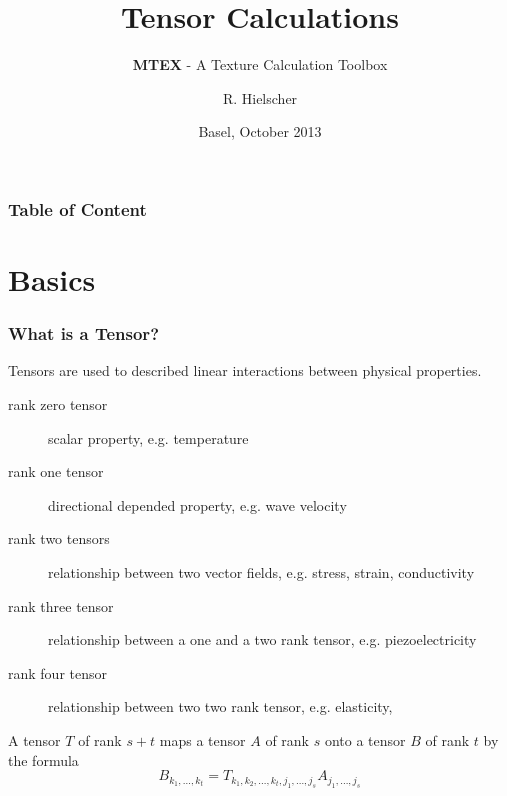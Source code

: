 \documentclass[compress]{beamer}
\author{R. Hielscher}
\title{Tensor Calculations}
\subtitle{{\bf{\color{red}M}TEX} - A Texture Calculation Toolbox}
\institute{Faculty of Mathematics,\\
	Chemnitz University of Technology, Germany}
\date{Basel, October 2013}
\begin{document}
\begin{frame}
  \maketitle{}
\end{frame}


\begin{frame}
  \frametitle{Table of Content}

\tableofcontents{}

\end{frame}

\section{Basics}

\begin{frame}
  \frametitle{What is a Tensor?}

  Tensors are used to described linear interactions between physical
  properties.

  \pause

  \begin{description}
    \item[rank zero tensor] scalar property, e.g. temperature
    \item[rank one tensor] directional depended property, e.g. wave velocity
    \item[rank two tensors] relationship between two vector fields,
    e.g. stress, strain, conductivity
    \item[rank three tensor] relationship between a one and a two rank tensor,
    e.g. piezoelectricity
    \item[rank four tensor] relationship between two two rank tensor, e.g. elasticity,
  \end{description}

  \pause

  A tensor $T$ of rank $s+t$ maps a tensor $A$ of rank $s$ onto a tensor $B$
  of rank $t$ by the formula
  \begin{equation*}
    B_{k_{1},\ldots,k_{t}}
    = T_{k_{1},k_{2},\ldots,k_{t},j_{1},\ldots,j_{s}} A_{j_{1},\ldots,j_{s}}
  \end{equation*}

\end{frame}
\end{document}
